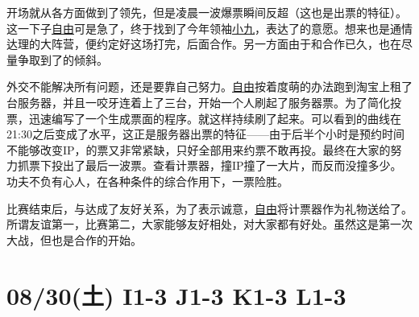 开场就从各方面做到了领先，但是凌晨一波爆票瞬间反超（这也是出票的特征）。这一下子\uline{自由}可是急了，终于找到了今年领袖\uline{小九}，表达了的意愿。想来也是通情达理的大阵营，便约定好这场打完，后面合作。另一方面由于和合作已久，也在尽量争取到了的倾斜。

外交不能解决所有问题，还是要靠自己努力。\uline{自由}按着度萌的办法跑到淘宝上租了台服务器，并且一咬牙连着上了三台，开始一个人刷起了服务器票。为了简化投票，迅速编写了一个生成票面的程序。就这样持续刷了起来。可以看到的曲线在21:30之后变成了水平，这正是服务器出票的特征——由于后半个小时是预约时间不能够改变IP，的票又非常紧缺，只好全部用来约票不敢再投。最终在大家的努力抓票下投出了最后一波票。查看计票器，撞IP撞了一大片，而反而没撞多少。功夫不负有心人，在各种条件的综合作用下，一票险胜。

比赛结束后，与达成了友好关系，为了表示诚意，\uline{自由}将计票器作为礼物送给了。所谓友谊第一，比赛第二，大家能够友好相处，对大家都有好处。虽然这是第一次大战，但也是合作的开始。

\section{08/30(土) I1-3 J1-3 K1-3 L1-3}


